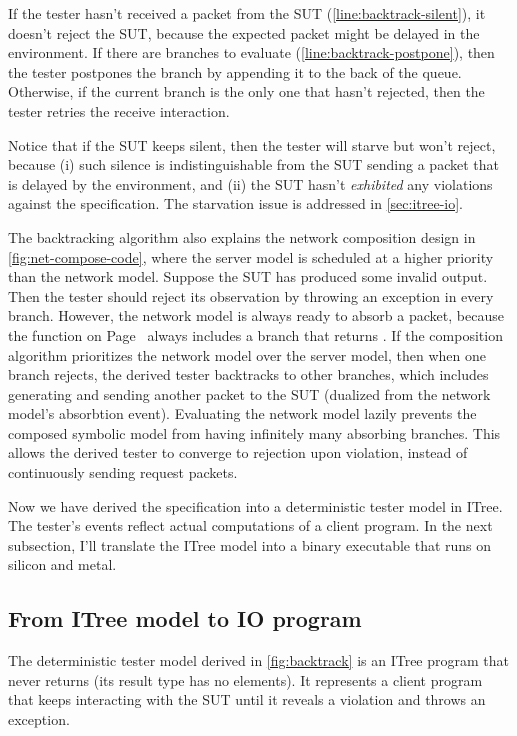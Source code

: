 \begin{enumerate}
  If the tester hasn't received a packet from the SUT
  (\autoref{line:backtrack-silent}), it doesn't reject the SUT, because the
  expected packet might be delayed in the environment.  If there are 
  branches to evaluate (\autoref{line:backtrack-postpone}), then the tester
  postpones the  branch by appending it to the back of the queue.
  Otherwise, if the current branch is the only one that hasn't rejected, then
  the tester retries the receive interaction.

  Notice that if the SUT keeps silent, then the tester will starve but won't
  reject, because (i) such silence is indistinguishable from the SUT sending a
  packet that is delayed by the environment, and (ii) the SUT hasn't {\em
  exhibited} any violations against the specification.  The starvation issue is
  addressed in \autoref{sec:itree-io}.
\end{enumerate}

The backtracking algorithm also explains the network composition design
in \autoref{fig:net-compose-code}, where the server model is scheduled at a
higher priority than the network model.  Suppose the SUT has produced some
invalid output.  Then the tester should reject its observation by throwing an
exception in every branch.  However, the network model is always ready to absorb
a packet, because the  function on Page~\pageref{def:pick-one}
always includes a branch that returns .  If the composition algorithm
prioritizes the network model over the server model, then when one branch
rejects, the derived tester backtracks to other branches, which includes
generating and sending another packet to the SUT (dualized from the network
model's absorbtion event).  Evaluating the network model lazily prevents the
composed symbolic model from having infinitely many absorbing branches.  This
allows the derived tester to converge to rejection upon violation, instead of
continuously sending request packets.

Now we have derived the specification into a deterministic tester model in
ITree.  The tester's events reflect actual computations of a client program.  In
the next subsection, I'll translate the ITree model into a binary executable
that runs on silicon and metal.

\subsection{From ITree model to IO program}
\label{sec:itree-io}
The deterministic tester model derived in \autoref{fig:backtrack} is an ITree
program that never returns (its result type  has no elements).  It
represents a client program that keeps interacting with the SUT until it reveals
a violation and throws an exception.

